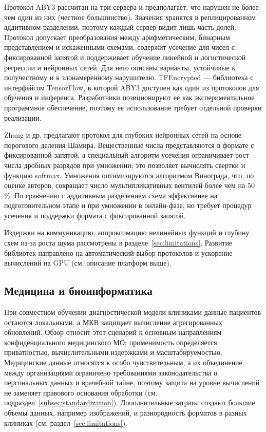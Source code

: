 Протокол ABY3 \cite{20} рассчитан на три сервера и предполагает, что нарушен не более чем один из них (честное большинство). Значения хранятся в реплицированном аддитивном разделении, поэтому каждый сервер видит лишь часть долей. Протокол допускает преобразования между арифметическим, бинарным представлением и искаженными схемами, содержит усечение для чисел с фиксированной запятой и поддерживает обучение линейной и логистической регрессии и нейронных сетей. Для него описаны варианты, устойчивые к получестному и к злонамеренному нарушителю. TFEncrypted \cite{21} --- библиотека с интерфейсом TensorFlow, в которой ABY3 доступен как один из протоколов для обучения и инференса. Разработчики позиционируют ее как экспериментальное программное обеспечение, поэтому ее использование требует отдельной проверки реализации.

Zhang и др. \cite{12} предлагают протокол для глубоких нейронных сетей на основе порогового деления Шамира. Вещественные числа представляются в формате с фиксированной запятой, а специальный алгоритм усечения ограничивает рост числа дробных разрядов при умножении; это позволяет вычислять свертки и функцию softmax. Умножения оптимизируются алгоритмом Винограда, что, по оценке авторов, сокращает число мультипликативных вентилей более чем на 50\,\%. По сравнению с аддитивным разделением схема эффективнее на подготовительном этапе и при умножении в онлайн-фазе, но требует процедур усечения и поддержки формата с фиксированной запятой.

Издержки на коммуникацию, аппроксимацию нелинейных функций и глубину схем из-за роста шума рассмотрены в разделе~\ref{sec:limitations}. Развитие библиотек направлено на автоматический выбор протоколов и ускорение вычислений на GPU (см. описание платформ выше).

\subsection{Медицина и биоинформатика}

При совместном обучении диагностической модели клиниками данные пациентов остаются локальными, а МКВ защищает вычисление агрегированных обновлений. Обзор \cite{11} относит этот сценарий к основным направлениям конфиденциального медицинского МО; применимость определяется приватностью, вычислительными издержками и масштабируемостью. Медицинские данные относятся к особо чувствительным, а их объединение между организациями ограничено требованиями законодательства о персональных данных и врачебной тайне, поэтому защита на уровне вычислений не заменяет правового основания обработки (см. подраздел~\ref{subsec:standardization}). Дополнительные затраты создают большие объемы данных, например изображений, и разнородность форматов в разных клиниках (см. раздел~\ref{sec:limitations}).

